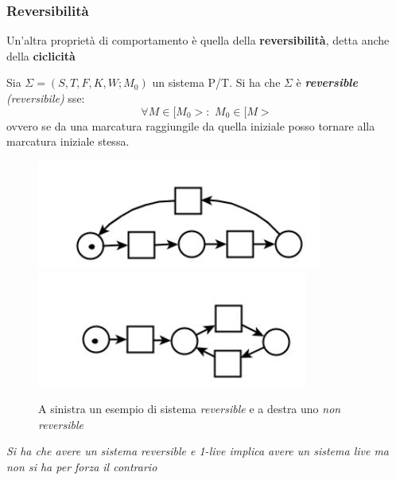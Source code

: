 \documentclass[a4paper,12pt, oneside]{book}
\begin{document}
\subsubsection{Reversibilità}
Un'altra proprietà di comportamento è quella della \textbf{reversibilità}, detta
anche della \textbf{ciclicità}
\begin{definizione}
  Sia $\Sigma=(S,T,F,K,W;M_0)$ un sistema P/T. Si ha che $\Sigma$ è
  \textit{\textbf{reversible} (\textit{reversibile})} sse:
  \[\forall M\in[M_0>:\,\,M_0\in[M>\]
  ovvero se da una marcatura raggiungile da quella iniziale posso tornare alla
  marcatura iniziale stessa.\\
  \begin{figure}[H]
    \includegraphics[scale = 0.55]{img/ptc10.jpg}
    ~
    \includegraphics[scale = 0.55]{img/ptc1.jpg}
    \caption{A sinistra un esempio di sistema \emph{reversible} e a destra uno
      \emph{non reversible}} 
  \end{figure}
  \textit{Si ha che avere un sistema \emph{reversible} e \emph{1-live} implica
    avere un sistema \emph{live} ma non si ha per forza il contrario}
\end{definizione}
\end{document}
